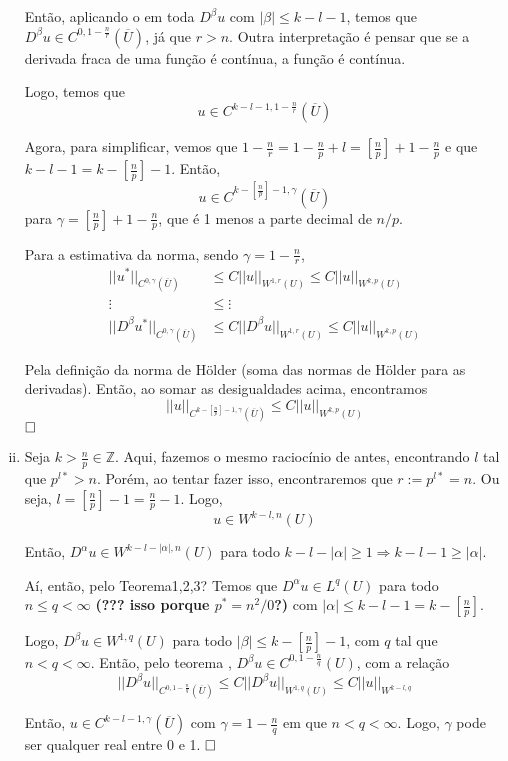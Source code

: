 \documentclass[11pt]{article}
\newcommand{\qed}{$\hfill\square$}
\newcommand{\Z}{\mathbb{Z}}
\begin{document}
\begin{enumerate}[(i)]
	Então, aplicando o  em toda $D^\beta u$ com $|\beta|\leq k-l-1$, temos que $D^\beta u \in C^{0, 1 - \frac{n}{r}}(\overline{U})$, já que $r>n$. Outra interpretação é pensar que se a derivada fraca de uma função é contínua, a função é contínua.
	
	
	
	
	Logo, temos que \[ u \in C^{k-l-1, 1 - \frac{n}{r}}(\overline{U}) \]
	
	Agora, para simplificar, vemos que $ 1-\frac{n}{r} = 1 - \frac{n}{p} + l = \left[\frac{n}{p}\right] + 1 - \frac{n}{p}$ e que $ k-l-1 = k - \left[\frac{n}{p}\right] - 1$. Então, \[ u \in C^{k-\left[\frac{n}{p}\right]-1, \gamma}(\overline{U}) \] para $\gamma = \left[\frac{n}{p}\right] + 1 - \frac{n}{p}$, que é 1 menos a parte decimal de $n/p$.
	
	Para a estimativa da norma, sendo $\gamma = 1 - \frac{n}{r}$,
	\begin{align*}
		||u^*||_{C^{0,\gamma}(\overline{U})} &\leq C ||u||_{W^{1,r}(U)}  \leq C ||u||_{W^{k,p}(U)}\\
		\vdots & \leq \vdots \\
		||D^\beta u^*||_{C^{0,\gamma}(\overline{U})} &\leq C ||D^\beta u||_{W^{1,r}(U)} \leq C ||u||_{W^{k,p}(U)}
	\end{align*}

	Pela definição da norma de Hölder (soma das normas de Hölder para as derivadas). Então, ao somar as desigualdades acima, encontramos
	\[ ||u||_{C^{k-\left[\frac{n}{p}\right]-1, \gamma}(\overline{U})} \leq C ||u||_{W^{k,p}(U)} \]\qed
	
	
	
	\item Seja $k>\frac{n}{p} \in \Z$. Aqui, fazemos o mesmo raciocínio de antes, encontrando $l$ tal que $p^{l*}>n$. Porém, ao tentar fazer isso, encontraremos que $r:= p^{l*}=n$. Ou seja, $l = \left[\frac{n}{p}\right]-1 = \frac{n}{p}-1$. Logo, \[ u \in W^{k-l,n}(U) \]
	
	Então, $ D^\alpha u \in W^{k-l-|\alpha|,n}(U) $ para todo $k-l-|\alpha|\geq1 \Rightarrow k-l-1 \geq |\alpha|$. 
	
	Aí, então, pelo Teorema1,2,3? Temos que $D^\alpha u \in L^q(U)$ para todo $n\leq q < \infty$ \textbf{(??? isso porque $p^* = n^2/0$?)} com $|\alpha|\leq k-l-1 = k - \left[\frac{n}{p}\right]$. 
	
	Logo, $D^\beta u \in W^{1,q}(U)$ para todo $|\beta| \leq k - \left[\frac{n}{p}\right] - 1$, com $q$ tal que $n<q<\infty$. Então, pelo teorema , $D^\beta u \in C^{0,1 - \frac{n}{q}}(U)$, com a relação \[ ||D^\beta u||_{C^{0,1 - \frac{n}{q}}(\overline{U})} \leq C ||D^\beta u||_{W^{1,q}(U)} \leq C ||u||_{W^{k-l,q}} \]
	
	Então, $ u \in C^{k-l-1,\gamma}(\overline{U}) $ com $\gamma = 1 - \frac{n}{q}$ em que $n < q < \infty$. Logo, $\gamma$ pode ser qualquer real entre 0 e 1. \qed
	
	
\end{enumerate}
\end{document}

